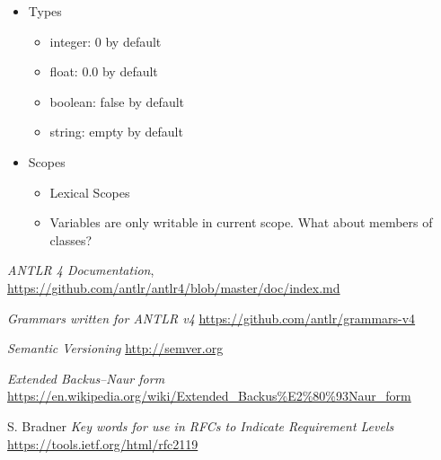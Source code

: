 \documentclass[a4paper,12pt]{report}
\begin{document}

\begin{itemize}
    \item Types
    \begin{itemize}
        \item integer: 0 by default
        \item float: 0.0 by default
        \item boolean: false by default
        \item string: empty by default
    \end{itemize} 
    \item Scopes
    \begin{itemize}
        \item Lexical Scopes
        \item Variables are only writable in current scope. What about members of classes?
    \end{itemize}
\end{itemize}

\clearpage

\begin{thebibliography}{100}

    \textit{ANTLR 4 Documentation},
    \url{https://github.com/antlr/antlr4/blob/master/doc/index.md}

    \textit{Grammars written for ANTLR v4}
    \url{https://github.com/antlr/grammars-v4}

    \textit{Semantic Versioning}
    \url{http://semver.org}

    \textit{Extended Backus–Naur form}
    \url{https://en.wikipedia.org/wiki/Extended_Backus%E2%80%93Naur_form}

    S. Bradner
    \textit{Key words for use in RFCs to Indicate Requirement Levels}
    \url{https://tools.ietf.org/html/rfc2119}

\end{thebibliography}
\end{document}
